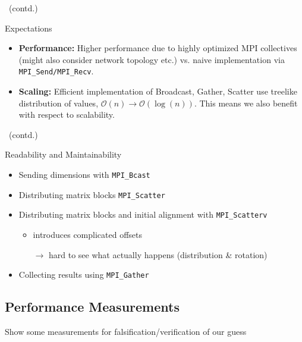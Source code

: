 \documentclass[9pt,pdftex,xcolor=dvipsnames]{beamer}
\begin{document}
\begin{frame}{\insertsubsection \ (contd.)}
\begin{block}{Expectations}
\begin{itemize}
\item \textbf{Performance:} Higher performance due to highly optimized MPI collectives (might also consider network topology etc.) vs. naive implementation via \lstinline[basicstyle=\ttfamily]{MPI_Send/MPI_Recv}.
\item \textbf{Scaling:} Efficient implementation of Broadcast, Gather, Scatter use treelike distribution of values, $\mathcal{O}\left(n\right) \rightarrow \mathcal{O}\left(\log(n)\right)$. This means we also benefit with respect to scalability.
\end{itemize}
\end{block}
\end{frame}


\begin{frame}{\insertsubsection \ (contd.)}
\begin{block}{Readability and Maintainability}
\begin{itemize}
\item[\textcolor{green}{\Checkmark}] Sending dimensions with \lstinline[basicstyle=\ttfamily]{MPI_Bcast}
\item[\textcolor{green}{\Checkmark}] Distributing matrix blocks \lstinline[basicstyle=\ttfamily]{MPI_Scatter}
\item[\textcolor{red}{\XSolidBrush}]
Distributing matrix blocks and initial alignment with \lstinline[basicstyle=\ttfamily]{MPI_Scatterv} 
	\begin{itemize}
	\item[$\rightarrow$] introduces complicated offsets 
	\item[$\rightarrow$] hard to see what actually happens (distribution \& rotation)
	\end{itemize} 
\item[\textcolor{green}{\Checkmark}] Collecting results using \lstinline[basicstyle=\ttfamily]{MPI_Gather}
\end{itemize}
\end{block}
\end{frame}



\subsection{Performance Measurements}
\begin{frame}{\insertsubsection}
Show some measurements for falsification/verification of our guess
\end{frame}
\end{document}
